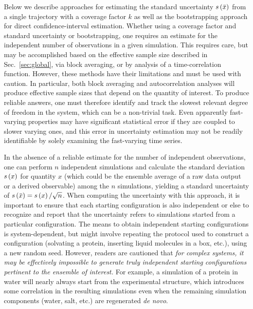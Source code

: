 
Below we describe approaches for estimating the standard uncertainty $s\left( \bar{x} \right)$ from a single trajectory with a coverage factor $k$ as well as the bootstrapping approach for direct confidence-interval estimation. Whether using a coverage factor and standard uncertainty or bootstrapping, one requires an estimate for the independent number of observations in a given simulation.  This requires care, but may be accomplished based on the effective sample size described in Sec.~\ref{sec:global}, via block averaging, or by analysis of a time-correlation function. However, these methods have their limitations and must be used with caution.  In particular, both block averaging and autocorrelation analyses will produce effective sample sizes that depend on the quantity of interest.  To produce reliable answers, one must therefore identify and track the slowest relevant degree of freedom in the system, which can be a non-trivial task.  Even apparently fast-varying properties may have significant statistical error if they are coupled to slower varying ones, and this error in uncertainty estimation may not be readily identifiable by solely examining the fast-varying time series.

In the absence of a reliable estimate for the number of independent observations, one can perform $n$ independent simulations and calculate the standard deviation $s\left( x \right)$ for quantity $x$ (which could be the ensemble average of a raw data output or a derived observable) among the $n$ simulations, yielding a standard uncertainty of $s\left( \bar{x} \right) = s\left( x \right) / \sqrt{n}$.  When computing the uncertainty with this approach, it is important to ensure that each starting configuration is also independent or else to recognize and report that the uncertainty refers to simulations started from a particular configuration.  The means to obtain independent starting configurations is system-dependent, but might involve repeating the protocol used to construct a configuration (solvating a protein, inserting liquid molecules in a box, etc.), using a new random seed.  However, readers are cautioned that \emph{for complex systems, it may be effectively impossible to generate truly independent starting configurations pertinent to the ensemble of interest.}  For example, a simulation of a protein in water will nearly always start from the experimental structure, which introduces some correlation in the resulting simulations even when the remaining simulation components (water, salt, etc.) are regenerated {\it de novo}.  

